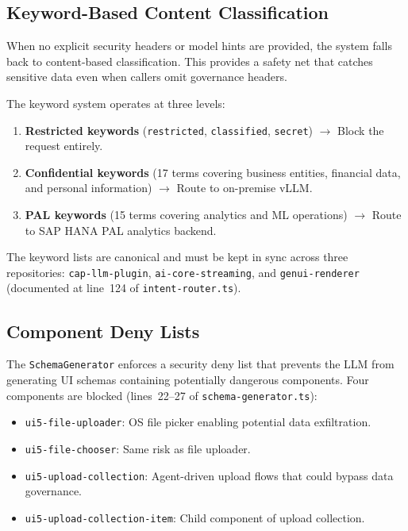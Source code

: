 \documentclass[11pt]{article}
\begin{document}
\subsection{Keyword-Based Content Classification}

When no explicit security headers or model hints are provided, the system
falls back to content-based classification. This provides a safety net that
catches sensitive data even when callers omit governance headers.

The keyword system operates at three levels:

\begin{enumerate}
  \item \textbf{Restricted keywords} (\texttt{restricted}, \texttt{classified},
        \texttt{secret}) $\rightarrow$ Block the request entirely.
  \item \textbf{Confidential keywords} (17 terms covering business entities,
        financial data, and personal information) $\rightarrow$ Route to
        on-premise vLLM.
  \item \textbf{PAL keywords} (15 terms covering analytics and ML operations)
        $\rightarrow$ Route to SAP HANA PAL analytics backend.
\end{enumerate}

The keyword lists are canonical and must be kept in sync across three
repositories: \texttt{cap-llm-plugin}, \texttt{ai-core-streaming}, and
\texttt{genui-renderer} (documented at line~124 of \texttt{intent-router.ts}).

\subsection{Component Deny Lists}

The \texttt{SchemaGenerator} enforces a security deny list that prevents the
LLM from generating UI schemas containing potentially dangerous components.
Four components are blocked (lines~22--27 of \texttt{schema-generator.ts}):

\begin{itemize}
  \item \texttt{ui5-file-uploader}: OS file picker enabling potential data
        exfiltration.
  \item \texttt{ui5-file-chooser}: Same risk as file uploader.
  \item \texttt{ui5-upload-collection}: Agent-driven upload flows that could
        bypass data governance.
  \item \texttt{ui5-upload-collection-item}: Child component of upload
        collection.
\end{itemize}
\end{document}
